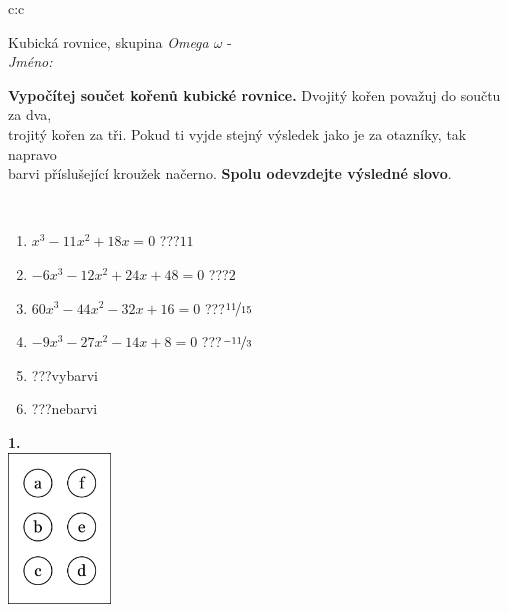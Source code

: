 \documentclass[10pt]{report}
\begin{document}
\begin{tabular}{c:c}
\begin{minipage}[c][104.5mm][t]{0.5\linewidth}
\begin{center}
\vspace{7mm}
{\huge Kubická rovnice, skupina \textit{Omega $\omega$} -}\\[5mm]
\textit{Jméno:}\phantom{xxxxxxxxxxxxxxxxxxxxxxxxxxxxxxxxxxxxxxxxxxxxxxxxxxxxxxxxxxxxxxxxx}\\[5mm]
\begin{minipage}{0.95\linewidth}
\begin{center}
\textbf{Vypočítej součet kořenů kubické rovnice.} Dvojitý kořen považuj do součtu za dva,\\trojitý kořen za tři. Pokud ti vyjde stejný výsledek jako je za otazníky, tak napravo\\barvi příslušející kroužek načerno. \textbf{Spolu odevzdejte výsledné slovo}.
\end{center}
\end{minipage}
\\[1mm]
\begin{minipage}{0.79\linewidth}
\begin{center}
\begin{varwidth}{\linewidth}
\begin{enumerate}
\Large
\item $x^3-11x^2+18x=0$\quad \dotfill\; ???\;\dotfill \quad $11$
\item $-6x^3-12x^2+24x+48=0$\quad \dotfill\; ???\;\dotfill \quad $2$
\item $60x^3-44x^2-32x+16=0$\quad \dotfill\; ???\;\dotfill \quad $\nicefrac{11}{15}$
\item $-9x^3-27x^2-14x+8=0$\quad \dotfill\; ???\;\dotfill \quad $\nicefrac{-11}{3}$
\item \quad \dotfill\; ???\;\dotfill \quad vybarvi
\item \quad \dotfill\; ???\;\dotfill \quad nebarvi
\end{enumerate}
\end{varwidth}
\end{center}
\end{minipage}
\begin{minipage}{0.20\linewidth}
\begin{center}
{\Huge\bfseries 1.} \\[2mm]
\includegraphics[height=40mm]{../images/braille.png}

\end{center}
\end{minipage}
\end{center}
\end{minipage}
\end{tabular}
\end{document}
